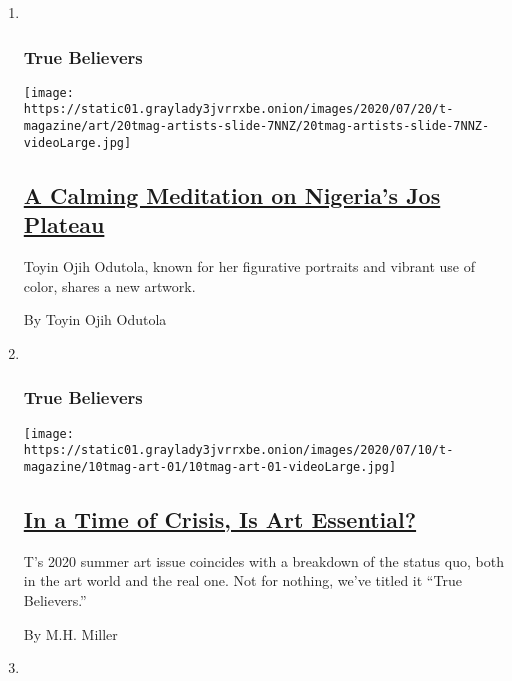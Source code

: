 \begin{enumerate}
\def\labelenumi{\arabic{enumi}.}
\item ~
  \hypertarget{true-believers-8}{%
  \subsubsection{True Believers}\label{true-believers-8}}

  \texttt{[image: https://static01.graylady3jvrrxbe.onion/images/2020/07/20/t-magazine/art/20tmag-artists-slide-7NNZ/20tmag-artists-slide-7NNZ-videoLarge.jpg]}

  \hypertarget{a-calming-meditation-on-nigerias-jos-plateau}{%
  \subsection{\texorpdfstring{\href{/2020/07/22/t-magazine/toyin-ojih-odutola.html}{A
  Calming Meditation on Nigeria's Jos
  Plateau}}{A Calming Meditation on Nigeria's Jos Plateau}}\label{a-calming-meditation-on-nigerias-jos-plateau}}

  Toyin Ojih Odutola, known for her figurative portraits and vibrant use
  of color, shares a new artwork.

  By Toyin Ojih Odutola
\item ~
  \hypertarget{true-believers-9}{%
  \subsubsection{True Believers}\label{true-believers-9}}

  \texttt{[image: https://static01.graylady3jvrrxbe.onion/images/2020/07/10/t-magazine/10tmag-art-01/10tmag-art-01-videoLarge.jpg]}

  \hypertarget{in-a-time-of-crisis-is-art-essential}{%
  \subsection{\texorpdfstring{\href{/2020/07/20/t-magazine/museums-galleries-open-art.html}{In
  a Time of Crisis, Is Art
  Essential?}}{In a Time of Crisis, Is Art Essential?}}\label{in-a-time-of-crisis-is-art-essential}}

  T's 2020 summer art issue coincides with a breakdown of the status
  quo, both in the art world and the real one. Not for nothing, we've
  titled it ``True Believers.''

  By M.H. Miller
\item ~
  \hypertarget{true-believers-10}{%
}
\end{enumerate}
